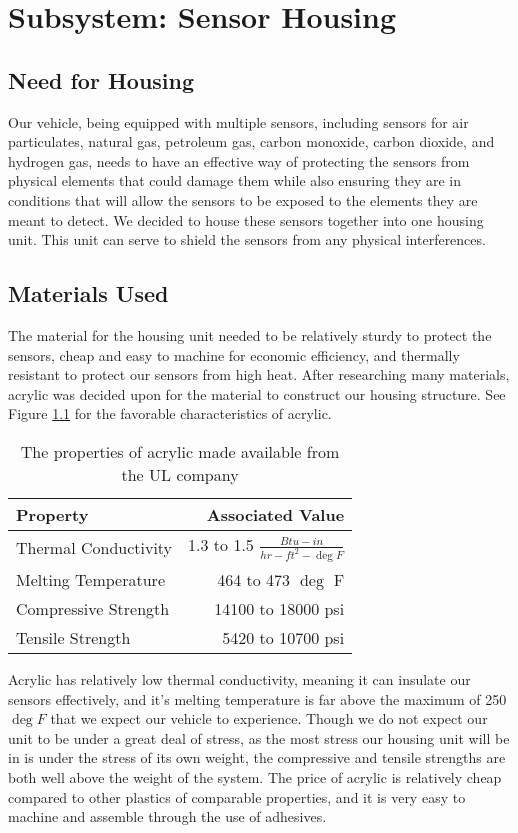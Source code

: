 \chapter{Subsystem: Sensor Housing}

\section{Need for Housing} Our vehicle, being equipped with multiple sensors, including sensors for air particulates, natural gas, petroleum gas, carbon monoxide, carbon dioxide, and hydrogen gas, needs to have an effective way of protecting the sensors from physical elements that could damage them while also ensuring they are in conditions that will allow the sensors to be exposed to the elements they are meant to detect. We decided to house these sensors together into one housing unit. This unit can serve to shield the sensors from any physical interferences.

\section{Materials Used} The material for the housing unit needed to be relatively sturdy to protect the sensors, cheap and easy to machine for economic efficiency, and thermally resistant to protect our sensors from high heat. After researching many materials, acrylic was decided upon for the material to construct our housing structure. See Figure \ref{tab:Acrylic Properties} for the favorable characteristics of acrylic. 

\begin{table}
\centering
\begin{tabular}{l|r}
Property & Associated Value \\\hline
Thermal Conductivity & 1.3 to 1.5 $\frac{Btu-in}{hr-ft^2-\deg F}$ \\
Melting Temperature & 464 to 473 $\deg$ F \\
Compressive Strength & 14100 to 18000 psi \\
Tensile Strength & 5420 to 10700 psi \\
\end{tabular}
\caption{\label{tab:Acrylic Properties} The properties of acrylic made available from the UL company \cite{UL}}
\end{table}

Acrylic has relatively low thermal conductivity, meaning it can insulate our sensors effectively, and it's melting temperature is far above the maximum of 250$\deg F$ that we expect our vehicle to experience. Though we do not expect our unit to be under a great deal of stress, as the most stress our housing unit will be in is under the stress of its own weight, the compressive and tensile strengths are both well above the weight of the system. The price of acrylic is relatively cheap compared to other plastics of comparable properties, and it is very easy to machine and assemble through the use of adhesives.

